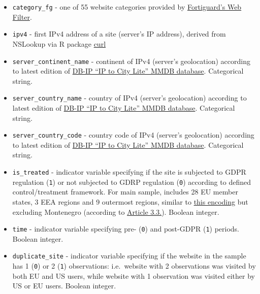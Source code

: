 \documentclass[
]{article}
\begin{document}
\begin{itemize}
\item
  \texttt{category\_fg} - one of 55 website categories provided by
  \href{https://bit.ly/36qWJl2}{Fortiguard's Web Filter}.
\item
  \texttt{ipv4} - first IPv4 address of a site (server's IP address),
  derived from NSLookup via R package
  \href{https://bit.ly/2VMo4td}{curl}
\item
  \texttt{server\_continent\_name} - continent of IPv4 (server's
  geolocation) according to latest edition of
  \href{https://t.ly/to8l}{DB-IP ``IP to City Lite'' MMDB database}.
  Categorical string.
\item
  \texttt{server\_country\_name} - country of IPv4 (server's
  geolocation) according to latest edition of
  \href{https://t.ly/to8l}{DB-IP ``IP to City Lite'' MMDB database}.
  Categorical string.
\item
  \texttt{server\_country\_code} - country code of IPv4 (server's
  geolocation) according to latest edition of
  \href{https://t.ly/to8l}{DB-IP ``IP to City Lite'' MMDB database}.
  Categorical string.
\item
  \texttt{is\_treated} - indicator variable specifying if the site is
  subjected to GDPR regulation (\texttt{1}) or not subjected to GDRP
  regulation (\texttt{0}) according to defined control/treatment
  framework. For main sample, includes 28 EU member states, 3 EEA
  regions and 9 outermost regions, similar to
  \href{https://bit.ly/2yuhiAs}{this encoding} but excluding Montenegro
  (according to \href{https://bit.ly/2VyZpIg}{Article 3.3.}). Boolean
  integer.
\item
  \texttt{time} - indicator variable specifying pre- (\texttt{0}) and
  post-GDPR (\texttt{1}) periods. Boolean integer.
\item
  \texttt{duplicate\_site} - indicator variable specifying if the
  website in the sample has 1 (\texttt{0}) or 2 (\texttt{1})
  observations: i.e.~website with 2 observations was visited by both EU
  and US users, while website with 1 observation was visited either by
  US or EU users. Boolean integer.
\end{itemize}
\end{document}
